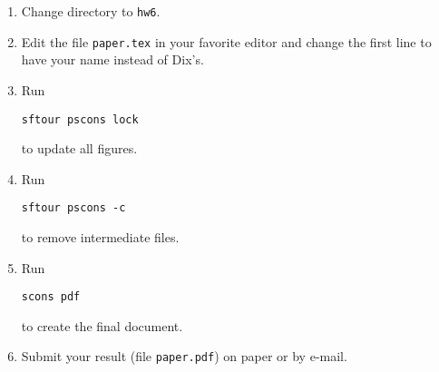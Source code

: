 \begin{enumerate}
\item Change directory to \texttt{hw6}.
\item Edit the file \texttt{paper.tex} in your favorite editor and change the first line to have your name instead of Dix's.
\item Run
\begin{verbatim}
sftour pscons lock
\end{verbatim}
to update all figures.
\item Run
\begin{verbatim}
sftour pscons -c
\end{verbatim}
to remove intermediate files.
\item Run
\begin{verbatim} 
scons pdf
\end{verbatim}
to create the final document.
\item Submit your result (file \texttt{paper.pdf}) on paper or by
  e-mail. 
\end{enumerate}

 


